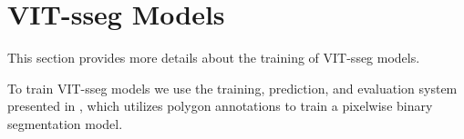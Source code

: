 \begin{table}[t]
\end{table}




\section{VIT-sseg Models}
\label{sec:vit_models}

This section provides more details about the training of VIT-sseg models.

To train VIT-sseg models we use the training, prediction, and evaluation system presented in
  \cite{Greenwell_2024_WACV, crall_geowatch_2024}, which utilizes polygon annotations to train a pixelwise
  binary segmentation model.


